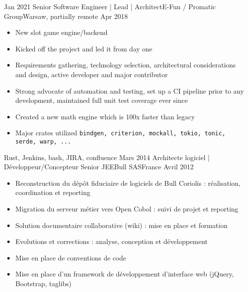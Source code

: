 \begin{experiences}
  \experience
    {Jan 2021} {Senior Software Engineer | Lead | Architect}{E-Fun / Promatic Group}{Warsaw, partially remote}
    {Apr 2018}    {
                      \begin{itemize}
                        \item New slot game engine/backend
                        \item Kicked off the project and led it from day one
                        \item Requirements gathering, technology selection, architectural considerations and design, active developer and major contributor
                        \item Strong advocate of automation and testing, set up a CI pipeline prior to any development, maintained full unit test coverage ever since
                        \item Created a new math engine which is 100x faster than legacy
                        \item Major crates utilized \newline
                        \texttt{bindgen, criterion, mockall, tokio, tonic, serde, warp, ...}
                      \end{itemize}
                    }
                    {Rust, Jenkins, bash, JIRA, confluence}
  \emptySeparator
  \experience
    {Mars 2014}     {Architecte logiciel | Développeur/Concepteur Senior JEE}{Bull SAS}{France}
    {Avril 2012}    {
                      \begin{itemize}
                        \item Reconstruction du dépôt fiduciaire de logiciels de Bull Coriolis : réalisation, coordination et reporting
                        \item Migration du serveur métier vers Open Cobol : suivi de projet et reporting                
                        \item Solution documentaire collaborative (wiki) : mise en place et formation                   
                        \item Evolutions et corrections : analyse, conception et développement                          
                        \item Mise en place de conventions de code                                                      
                        \item Mise en place d'un framework de développement d'interface web (jQuery, Bootstrap, taglibs)
                      \end{itemize}
}
\end{experiences}
